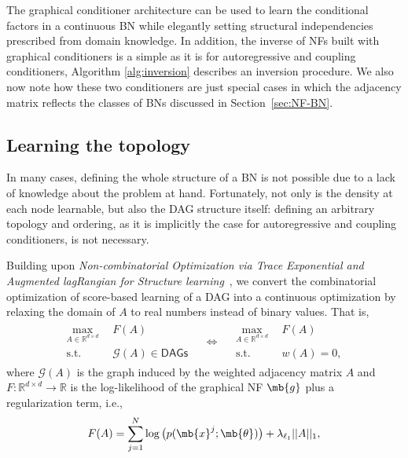 The graphical conditioner architecture can be used to learn the conditional factors in a continuous BN while elegantly setting structural independencies prescribed from domain knowledge. In addition, the inverse of NFs built with graphical conditioners is a simple as it is for autoregressive and coupling conditioners, Algorithm \ref{alg:inversion} describes an inversion procedure.
We also now note how these two conditioners are just special cases in which the adjacency matrix reflects the classes of BNs discussed in Section~\ref{sec:NF-BN}.

\subsection{Learning the topology}\label{sec:learn_topo}
In many cases, defining the whole structure of a BN is not possible due to a lack of knowledge about the problem at hand.
Fortunately, not only is the density at each node learnable, but also the DAG structure itself:
defining an arbitrary topology and ordering, as it is implicitly the case for autoregressive and coupling conditioners, is not necessary.

Building upon \textit{Non-combinatorial Optimization via Trace Exponential and Augmented lagRangian for
Structure learning}~\citep[NO TEARS, ][]{DAG-1}, we convert the combinatorial optimization of score-based learning of a DAG into a continuous optimization by relaxing the domain of $A$ to real numbers instead of binary values. That is,
\begin{align}\label{eq:DAG-relax}
\begin{aligned}
\max_{A\in\mathbb{R}^{d\times d}} & \ \ F(A) \\
\text{s.t.} & \ \ \mathcal{G}(A) \in \mathsf{DAGs}
\end{aligned}
\quad \iff \quad
\begin{aligned}
\max_{A\in\mathbb{R}^{d\times d}} & \ \  F(A) \\
\text{s.t.} & \ \ w(A) = 0,
\end{aligned}
\end{align}
where $\mathcal{G}(A)$ is the graph induced by the weighted adjacency matrix $A$ and $F: \mathbb{R}^{d \times d}\rightarrow \mathbb{R}$ is the log-likelihood of the graphical NF $\mb{g}$ plus a regularization term, i.e.,
\begin{align}
     F(A) = \sum^N_{j=1}\log\big(p(\mb{x}^j; \mb{\theta})\big) + \lambda_{\ell_1} ||A||_1, \label{eq:score}
\end{align}

